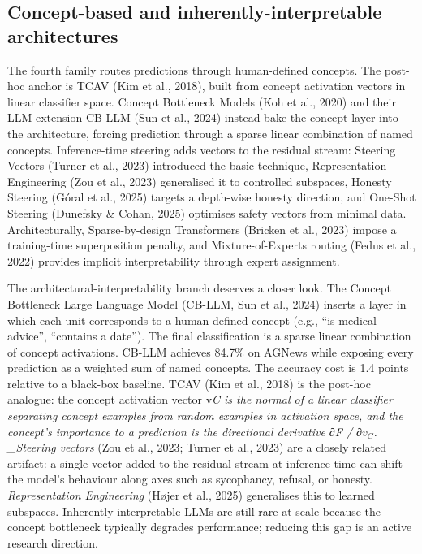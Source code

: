 \subsection{Concept-based and inherently-interpretable architectures}\label{concept-based-and-inherently-interpretable-architectures}

The fourth family routes predictions through human-defined concepts. The post-hoc anchor is TCAV (Kim et al., 2018), built from concept activation vectors in linear classifier space. Concept Bottleneck Models (Koh et al., 2020) and their LLM extension CB-LLM (Sun et al., 2024) instead bake the concept layer into the architecture, forcing prediction through a sparse linear combination of named concepts. Inference-time steering adds vectors to the residual stream: Steering Vectors (Turner et al., 2023) introduced the basic technique, Representation Engineering (Zou et al., 2023) generalised it to controlled subspaces, Honesty Steering (Góral et al., 2025) targets a depth-wise honesty direction, and One-Shot Steering (Dunefsky \& Cohan, 2025) optimises safety vectors from minimal data. Architecturally, Sparse-by-design Transformers (Bricken et al., 2023) impose a training-time superposition penalty, and Mixture-of-Experts routing (Fedus et al., 2022) provides implicit interpretability through expert assignment.

The architectural-interpretability branch deserves a closer look. The Concept Bottleneck Large Language Model (CB-LLM, Sun et al., 2024) inserts a layer in which each unit corresponds to a human-defined concept (e.g., ``is medical advice'', ``contains a date''). The final classification is a sparse linear combination of concept activations. CB-LLM achieves 84.7\% on AGNews while exposing every prediction as a weighted sum of named concepts. The accuracy cost is 1.4 points relative to a black-box baseline. TCAV (Kim et al., 2018) is the post-hoc analogue: the concept activation vector v\emph{C is the normal of a linear classifier separating concept examples from random examples in activation space, and the concept's importance to a prediction is the directional derivative ∂F / ∂\(v_C\). \_Steering vectors} (Zou et al., 2023; Turner et al., 2023) are a closely related artifact: a single vector added to the residual stream at inference time can shift the model's behaviour along axes such as sycophancy, refusal, or honesty. \emph{Representation Engineering} (Højer et al., 2025) generalises this to learned subspaces. Inherently-interpretable LLMs are still rare at scale because the concept bottleneck typically degrades performance; reducing this gap is an active research direction.

